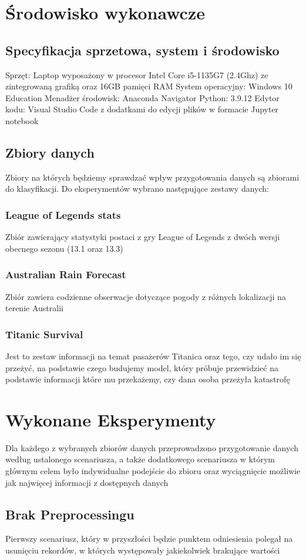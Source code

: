 \documentclass{book}
\begin{document}
\section{Środowisko wykonawcze}
\subsection{Specyfikacja sprzetowa, system i środowisko}
Sprzęt: Laptop wyposażony w procesor Intel Core i5-1135G7 
(2.4Ghz) ze zintegrowaną grafiką oraz 16GB pamięci RAM
System operacyjny: Windows 10 Education
Menadżer środowisk: Anaconda Navigator
Python: 3.9.12
Edytor kodu: Visual Studio Code z dodatkami do edycji plików w 
formacie Jupyter notebook
\subsection{Zbiory danych}
Zbiory na których będziemy sprawdzać wpływ przygotowania danych 
są zbiorami do klasyfikacji. Do eksperymentów wybrano następujące 
zestawy danych:
\subsubsection{League of Legends stats}
Zbiór zawierający statystyki postaci z gry League of Legends z 
dwóch wersji obecnego sezonu (13.1 oraz 13.3)
\subsubsection{Australian Rain Forecast}
Zbiór zawiera codzienne obserwacje dotyczące pogody z różnych 
lokalizacji na terenie Australii
\subsubsection{Titanic Survival}
Jest to zestaw informacji na temat pasażerów Titanica oraz tego, 
czy udało im się przeżyć, na podstawie czego budujemy model, 
który próbuje przewidzieć na podstawie informacji które mu przekażemy, 
czy dana osoba przeżyła katastrofę

\section{Wykonane Eksperymenty}
Dla każdego z wybranych zbiorów danych przeprowadzono 
przygotowanie danych według ustalonego scenariusza, 
a także dodatkowego scenariusza w którym głównym celem było 
indywidualne podejście do zbioru oraz wyciągnięcie możliwie 
jak najwięcej informacji z dostępnych danych
\subsection{Brak Preprocessingu}
Pierwszy scenariusz, który w przyszłości 
będzie punktem odniesienia polegał na usunięciu rekordów, 
w których występowały jakiekolwiek brakujące wartości
\end{document}
